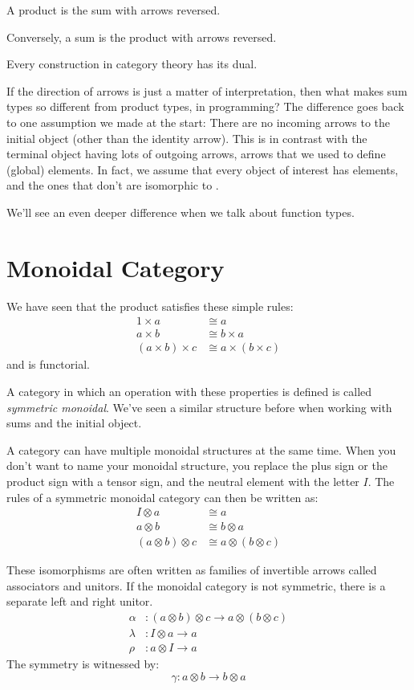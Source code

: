 \documentclass[DaoFP]{subfiles}
\begin{document}
A product is the sum with arrows reversed. 

Conversely, a sum is the product with arrows reversed. 

\medskip

Every construction in category theory has its dual.

\medskip

If the direction of arrows is just a matter of interpretation, then what makes sum types so different from product types, in programming? The difference goes back to one assumption we made at the start: There are no incoming arrows to the initial object (other than the identity arrow). This is in contrast with the terminal object having lots of outgoing arrows, arrows that we used to define (global) elements. In fact, we assume that every object of interest has elements, and the ones that don't are isomorphic to . 

We'll see an even deeper difference when we talk about function types.

\section{Monoidal Category}

We have seen that the product satisfies these simple rules:
\begin{align*}
1 \times a &\cong a
\\
a \times b &\cong b \times a
\\
(a \times b) \times c &\cong a \times (b \times c)
\end{align*}
and is functorial. 

A category in which an operation with these properties is defined is called \emph{symmetric monoidal}. We've seen a similar structure before when working with sums and the initial object. 

A category can have multiple monoidal structures at the same time. When you don't want to name your monoidal structure, you replace the plus sign or the product sign with a tensor sign, and the neutral element with the letter $I$. The rules of a symmetric monoidal category can then be written as:
\begin{align*}
I \otimes a &\cong a
\\
a \otimes b &\cong b \otimes a
\\
(a \otimes b) \otimes c &\cong a \otimes (b \otimes c)
\end{align*}

These isomorphisms are often written as families of invertible arrows called associators and unitors. If the monoidal category is not symmetric, there is a separate left and right unitor.
\begin{align*}
\alpha &\colon (a \otimes b) \otimes c \to a \otimes (b \otimes c)
\\
 \lambda &\colon I \otimes a \to a
 \\
 \rho &\colon a \otimes I \to a
\end{align*}
The symmetry is witnessed by:
\[ \gamma \colon a \otimes b \to b \otimes a \]
\end{document}
